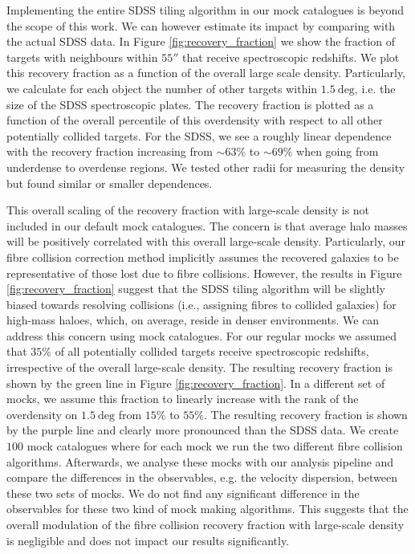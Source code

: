 \documentclass[fleqn,usenatbib,useAMS]{mnras}
\begin{document}
	Implementing the entire SDSS tiling algorithm in our mock catalogues is beyond the scope of this work. We can however estimate its impact by comparing with the actual SDSS data. In Figure \ref{fig:recovery_fraction} we show the fraction of targets with neighbours within $55''$ that receive spectroscopic redshifts. We plot this recovery fraction as a function of the overall large scale density. Particularly, we calculate for each object the number of other targets within $1.5 \ \mathrm{deg}$, i.e. the size of the SDSS spectroscopic plates. The recovery fraction is plotted as a function of the overall percentile of this overdensity with respect to all other potentially collided targets. For the SDSS, we see a roughly linear dependence with the recovery fraction increasing from $\sim 63\%$ to $\sim 69\%$ when going from underdense to overdense regions. We tested other radii for measuring the density but found similar or smaller dependences.
	
	This overall scaling of the recovery fraction with large-scale density is not included in our default mock catalogues. The concern is that average halo masses will be positively correlated with this overall large-scale density. Particularly, our fibre collision correction method implicitly assumes the recovered galaxies to be representative of those lost due to fibre collisions. However, the results in Figure \ref{fig:recovery_fraction} suggest that the SDSS tiling algorithm will be slightly biased towards resolving collisions (i.e., assigning fibres to collided galaxies) for high-mass haloes, which, on average, reside in denser environments. We can address this concern using mock catalogues. For our regular mocks we assumed that $35\%$ of all potentially collided targets receive spectroscopic redshifts, irrespective of the overall large-scale density. The resulting recovery fraction is shown by the green line in Figure \ref{fig:recovery_fraction}. In a different set of mocks, we assume this fraction to linearly increase with the rank of the overdensity on $1.5 \ \mathrm{deg}$ from $15\%$ to $55\%$. The resulting recovery fraction is shown by the purple line and clearly more pronounced than the SDSS data. We create $100$ mock catalogues where for each mock we run the two different fibre collision algorithms. Afterwards, we analyse these mocks with our analysis pipeline and compare the differences in the observables, e.g. the velocity dispersion, between these two sets of mocks. We do not find any significant difference in the observables for these two kind of mock making algorithms. This suggests that the overall modulation of the fibre collision recovery fraction with large-scale density is negligible and does not impact our results significantly.
	
\end{document}
